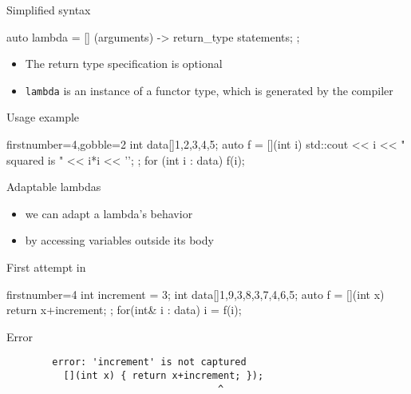\begin{frame}[fragile]
  \begin{block}{Simplified syntax}
    \begin{cppcode*}{}
      auto lambda = [] (arguments) -> return_type {
        statements;
      };
    \end{cppcode*}
    \begin{itemize}
    \item The return type specification is optional
    \item \texttt{lambda} is an instance of a functor type, which is generated by the compiler
    \end{itemize}
  \end{block}
  \begin{exampleblock}{Usage example}
    \begin{cppcode*}{firstnumber=4,gobble=2}
      int data[]{1,2,3,4,5};
      auto f = [](int i) {
        std::cout << i << " squared is " << i*i << '\n';
      };
      for (int i : data) f(i);
    \end{cppcode*}
  \end{exampleblock}
\end{frame}


\begin{frame}[fragile]
  \begin{block}{Adaptable lambdas}
    \begin{itemize}
      \item we can adapt a lambda's behavior
      \item by accessing variables outside its body
    \end{itemize}
  \end{block}
  \pause
  \begin{block}{First attempt in \cpp}
    \begin{cppcode*}{firstnumber=4}
      int increment = 3;
      int data[]{1,9,3,8,3,7,4,6,5};
      auto f = [](int x) { return x+increment; };
      for(int& i : data) i = f(i);
    \end{cppcode*}
  \end{block}
  \pause
  \begin{alertblock}{Error}
    \begin{verbatim}
        error: 'increment' is not captured
          [](int x) { return x+increment; });
                                     ^
    \end{verbatim}
  \end{alertblock}
\end{frame}

